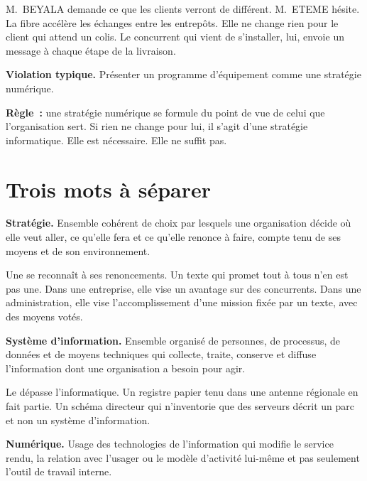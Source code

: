 M.~BEYALA demande ce que les clients verront de différent. M.~ETEME hésite. La fibre accélère les échanges entre
les entrepôts. Elle ne change rien pour le client qui attend un colis. Le concurrent qui vient de s'installer,
lui, envoie un message à chaque étape de la livraison.

\begin{boxalert}
\textbf{Violation typique.} Présenter un programme d'équipement comme une stratégie numérique.

\smallskip
\textbf{Règle~:} une stratégie numérique se formule du point de vue de celui que l'organisation sert. Si rien
ne change pour lui, il s'agit d'une stratégie informatique. Elle est nécessaire. Elle ne suffit pas.
\end{boxalert}

\section{Trois mots à séparer}
\label{sec:c01-mots}

\begin{boxdef}
\textbf{Stratégie.} Ensemble cohérent de choix par lesquels une organisation décide où elle veut aller, ce qu'elle
fera et ce qu'elle renonce à faire, compte tenu de ses moyens et de son environnement.
\end{boxdef}

Une  se reconnaît à ses renoncements. Un texte qui promet tout à tous n'en est pas une. Dans
une entreprise, elle vise un avantage sur des concurrents. Dans une administration, elle vise l'accomplissement
d'une mission fixée par un texte, avec des moyens votés.

\begin{boxdef}
\textbf{Système d'information.} Ensemble organisé de personnes, de processus, de données et de moyens
techniques qui collecte, traite, conserve et diffuse l'information dont une organisation a besoin pour agir.
\end{boxdef}

Le  dépasse l'informatique. Un registre papier tenu dans une antenne régionale
en fait partie. Un schéma directeur qui n'inventorie que des serveurs décrit un parc et non un système
d'information.

\begin{boxdef}
\textbf{Numérique.} Usage des technologies de l'information qui modifie le service rendu, la relation avec
l'usager ou le modèle d'activité lui-même et pas seulement l'outil de travail interne.
\end{boxdef}

